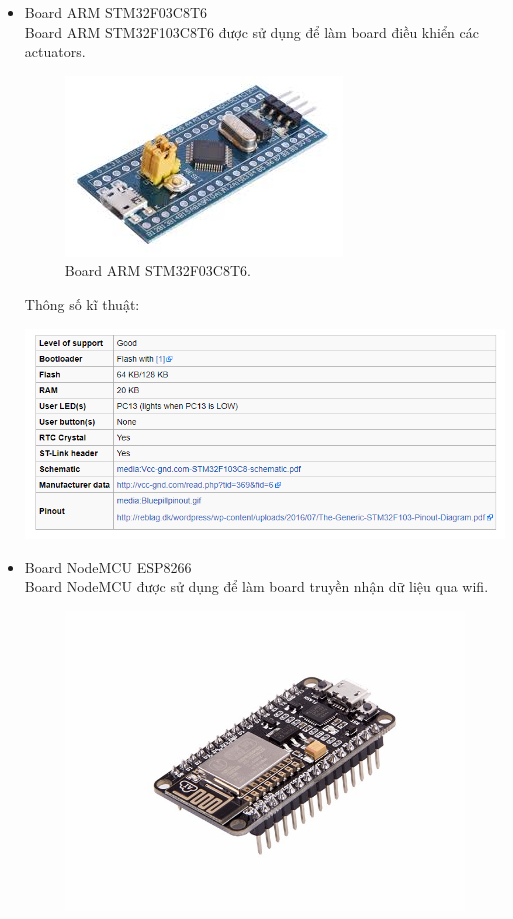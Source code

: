 \documentclass[a4paper,12pt,oneside]{article}
\begin{document}
\begin{itemize}
\item Board ARM STM32F03C8T6\\
\noindent Board ARM STM32F103C8T6 được sử dụng để làm board điều khiển các actuators.\\
\begin{figure}[h!]
\centering
\includegraphics[scale=.8]{hinh/stm32.jpg}
\caption{Board ARM STM32F03C8T6.}
\end{figure}
\noindent Thông số kĩ thuật:\\
\begin{center}
\includegraphics[scale=.6]{hinh/stm32KT.png}
\end{center}
\item Board NodeMCU ESP8266\\
\noindent Board NodeMCU được sử dụng để làm board truyền nhận dữ liệu qua wifi.\\
\begin{figure}[h!]
\centering
\includegraphics[scale=.4]{hinh/NodeMCU.jpg}

\end{figure}
\end{itemize}
\end{document}
